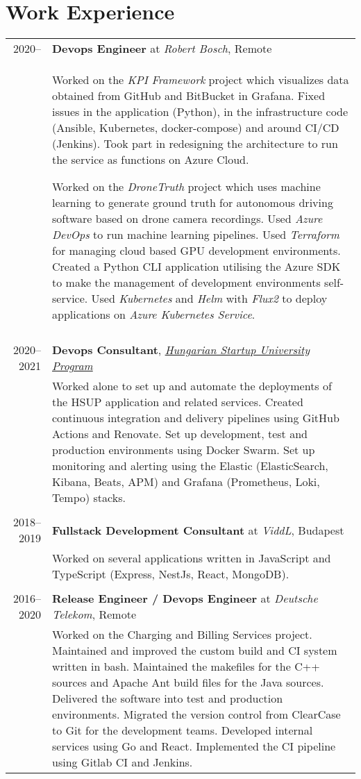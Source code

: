 \documentclass[a4paper,10pt]{article} %
\begin{document}
\section{Work Experience}
\begin{tabular}{r|p{12.5cm}}

\textsc{2020--} & \textbf{Devops Engineer} at \emph{Robert Bosch}, Remote \\
& \footnotesize{Worked on the \emph{KPI Framework} project which visualizes data obtained from GitHub and BitBucket in Grafana. Fixed issues in the application (Python), in the infrastructure code (Ansible, Kubernetes, docker-compose) and around CI/CD (Jenkins). Took part in redesigning the architecture to run the service as functions on Azure Cloud. 

Worked on the \emph{DroneTruth} project which uses machine learning to generate ground truth for autonomous driving software based on drone camera recordings. Used \emph{Azure DevOps} to run machine learning pipelines. Used \emph{Terraform} for managing cloud based GPU development environments. Created a Python CLI application utilising the Azure SDK to make the management of development environments self-service. Used \emph{Kubernetes} and \emph{Helm} with \emph{Flux2} to deploy applications on \emph{Azure Kubernetes Service}.
}\\

\multicolumn{2}{c}{} \\
\textsc{2020--2021} & \textbf{Devops Consultant}, \href{https://hsup.nkfih.gov.hu}{\emph{Hungarian Startup University Program}} \\
& \footnotesize{Worked alone to set up and automate the deployments of the HSUP application and related services. Created continuous integration and delivery pipelines using GitHub Actions and Renovate. Set up development, test and production environments using Docker Swarm. Set up monitoring and alerting using the Elastic (ElasticSearch, Kibana, Beats, APM) and Grafana (Prometheus, Loki, Tempo) stacks.}\\

\multicolumn{2}{c}{} \\
\textsc{2018--2019} & \textbf{Fullstack Development Consultant} at \emph{ViddL}, Budapest \\
& \footnotesize{Worked on several applications written in JavaScript and TypeScript (Express, NestJs, React, MongoDB).}\\

\multicolumn{2}{c}{} \\
\textsc{2016--2020} & \textbf{Release Engineer / Devops Engineer} at \emph{Deutsche Telekom}, Remote \\
& \footnotesize{Worked on the Charging and Billing Services project. Maintained and improved the custom build and CI system written in bash. Maintained the makefiles for the C++ sources and Apache Ant build files for the Java sources. Delivered the software into test and production environments. Migrated the version control from ClearCase to Git for the development teams}. Developed internal services using Go and React. Implemented the CI pipeline using Gitlab CI and Jenkins.\\


\end{tabular}
\end{document}
